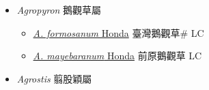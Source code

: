 
  \begin{itemize}
 \item[] \textit{Agropyron} 鵝觀草屬
                    
  \begin{itemize}
        \item[] \href{http://www.theplantlist.org/tpl1.1/search?q=Agropyron+formosanum}{\textit{A. formosanum} Honda}   臺灣鵝觀草\# LC
        \item[] \href{http://www.theplantlist.org/tpl1.1/search?q=Agropyron+mayebaranum}{\textit{A. mayebaranum} Honda}   前原鵝觀草 LC
  \end{itemize}
 \item[] \textit{Agrostis} 翦股穎屬
                    

\end{itemize}
